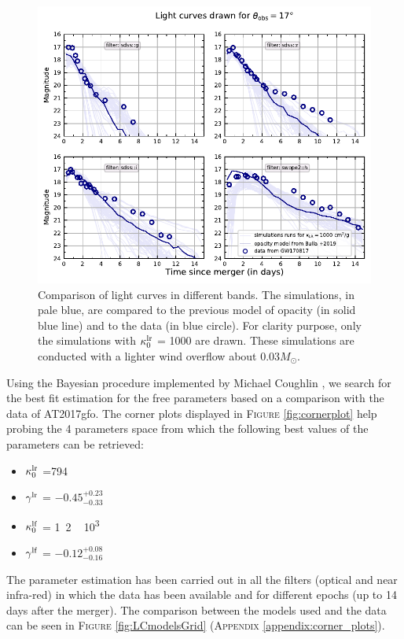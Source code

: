 \documentclass[a4paper, twoside, 11pt]{article}
\numberwithin{equation}{section}
\begin{document}
\begin{figure}[!h]
		\centering
        \includegraphics[width=\textwidth]{pictures/lc_simulations_kappaLR1000.pdf}
 \caption[Light curves comparison between different models]{Comparison of light curves in different bands. The simulations, in pale blue, are compared to the previous model of opacity \cite{POSSIS_2019} (in solid blue line) and to the data (in blue circle). For clarity purpose, only the simulations with $\kappa_0^{\rm{lr}}$ = 1000 are drawn. These simulations are conducted with a lighter wind overflow about 0.03$M_{\odot}$.} 
 \label{fig:simulationsGrid}
\end{figure}
Using the Bayesian procedure implemented by Michael Coughlin \cite{CoughlinMethod}, we search for the best fit estimation for the free parameters based on a comparison with the data of AT2017gfo. The corner plots displayed in F\textsc{igure} \ref{fig:cornerplot} help probing the 4 parameters space from which the following best values of the parameters can be retrieved: 
\begin{itemize}
\item $\kappa_0^{\rm{lr}}$ =\unit{ 794}{\square{\centi\meter}\per\gram} 
\item $\gamma^{\rm{lr}}$  = $-0.45_{-0.33}^{+0.23}$
\item $\kappa_0^{\rm{lf}}$ = \unit{ 1.2\, 10^{3}}{\square{\centi\meter}\per\gram} 
\item $\gamma^{\rm{lf}}$ = $-0.12_{-0.16}^{+0.08}$
\end{itemize}
The parameter estimation has been carried out in all the filters  (optical and near infra-red) in which the data has been available and for different epochs (up to 14 days after the merger). The comparison between the models used and the data can be seen in F\textsc{igure} \ref{fig:LCmodelsGrid} (A\textsc{ppendix} \ref{appendix:corner_plots}).
\end{document}
